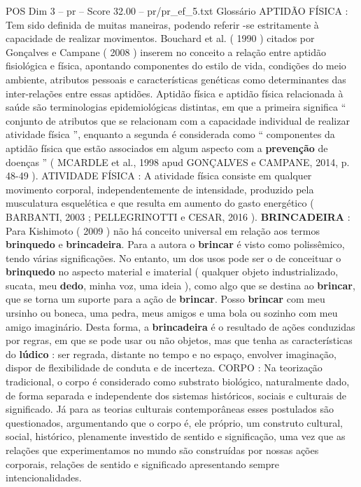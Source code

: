 \begin{textsample}{POS Dim 3 – pr – Score 32.00 – pr/pr\_ef\_5.txt}  \label{ex:f3_pos_152}
Glossário APTIDÃO FÍSICA : Tem sido definida de muitas maneiras, podendo referir -se estritamente à capacidade de realizar movimentos.
Bouchard et al. ( 1990 ) citados por Gonçalves e Campane ( 2008 ) inserem no conceito a relação entre aptidão fisiológica e física, apontando componentes do estilo de vida, condições do meio ambiente, atributos pessoais e características genéticas como determinantes das inter-relações entre essas aptidões.
Aptidão física e aptidão física relacionada à saúde são terminologias epidemiológicas distintas, em que a primeira significa “ conjunto de atributos que se relacionam com a capacidade individual de realizar atividade física ”, enquanto a segunda é considerada como “ componentes da aptidão física que estão associados em algum aspecto com a \textbf{prevenção} de doenças ” ( MCARDLE et al., 1998 apud GONÇALVES e CAMPANE, 2014, p. 48-49 ).
ATIVIDADE FÍSICA : A atividade física consiste em qualquer movimento corporal, independentemente de intensidade, produzido pela musculatura esquelética e que resulta em aumento do gasto energético ( BARBANTI, 2003 ; PELLEGRINOTTI e CESAR, 2016 ). \textbf{BRINCADEIRA} : Para Kishimoto ( 2009 ) não há conceito universal em relação aos termos \textbf{brinquedo} e \textbf{brincadeira}.
Para a autora o \textbf{brincar} é visto como polissêmico, tendo várias significações.
No entanto, um dos usos pode ser o de conceituar o \textbf{brinquedo} no aspecto material e imaterial ( qualquer objeto industrializado, sucata, meu \textbf{dedo}, minha voz, uma ideia ), como algo que se destina ao \textbf{brincar}, que se torna um suporte para a ação de \textbf{brincar}.
Posso \textbf{brincar} com meu ursinho ou boneca, uma pedra, meus amigos e uma bola ou sozinho com meu amigo imaginário.
Desta forma, a \textbf{brincadeira} é o resultado de ações conduzidas por regras, em que se pode usar ou não objetos, mas que tenha as características do \textbf{lúdico} : ser regrada, distante no tempo e no espaço, envolver imaginação, dispor de flexibilidade de conduta e de incerteza.
CORPO : Na teorização tradicional, o corpo é considerado como substrato biológico, naturalmente dado, de forma separada e independente dos sistemas históricos, sociais e culturais de significado.
Já para as teorias culturais contemporâneas esses postulados são questionados, argumentando que o corpo é, ele próprio, um construto cultural, social, histórico, plenamente investido de sentido e significação, uma vez que as relações que experimentamos no mundo são construídas por nossas ações corporais, relações de sentido e significado apresentando sempre intencionalidades.

\end{textsample}
